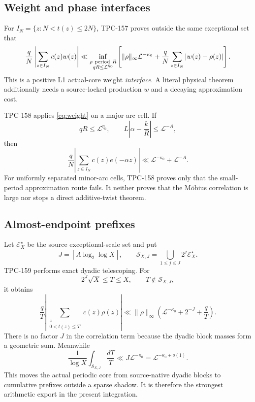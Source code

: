 \documentclass[11pt]{article}
\theoremstyle{definition}
\newcommand{\cL}{\mathcal L}
\newcommand{\cS}{\mathcal S}
\newcommand{\cE}{\mathcal E}
\begin{document}
\subsection{Weight and phase interfaces}

For \(I_N=\{z:N<t(z)\le 2N\}\), TPC-157 proves outside the same
exceptional set that
\begin{equation}
 \frac qN\left|\sum_{z\in I_N}c(z)w(z)\right|
 \ll
 \inf_{\substack{\rho\ {\rm period}\ R\\qR\le \cL^{\eta_0}}}
 \left[
   \|\rho\|_\infty\cL^{-\kappa_0}
   +\frac qN\sum_{z\in I_N}|w(z)-\rho(z)|
 \right].                                                     \label{eq:weight}
\end{equation}
This is a positive L1 actual-core weight \emph{interface}.  A literal
physical theorem additionally needs a source-locked production
\(w\) and a decaying approximation cost.

TPC-158 applies \eqref{eq:weight} on a major-arc cell.  If
\[
 qR\le\cL^{\eta_0},
 \qquad
 L\left|\alpha-\frac{k}{R}\right|\le\cL^{-A},
\]
then
\begin{equation}
 \frac qN\left|\sum_{z\in I_N}c(z)e(-\alpha z)\right|
 \ll \cL^{-\kappa_0}+\cL^{-A}.                                \label{eq:phase}
\end{equation}
For uniformly separated minor-arc cells, TPC-158 proves only that the
small-period approximation route fails.  It neither proves that the
M\"obius correlation is large nor stops a direct additive-twist
theorem.

\subsection{Almost-endpoint prefixes}

Let \(\cE_X^\star\) be the source exceptional-scale set and put
\[
 J=\left\lceil A\log_2\log X\right\rceil,
 \qquad
 \cS_{X,J}=\bigcup_{1\le j\le J}2^j\cE_X^\star.
\]
TPC-159 performs exact dyadic telescoping.  For
\[
 2^J\sqrt X\le T\le X,\qquad T\notin\cS_{X,J},
\]
it obtains
\begin{equation}
 \frac qT\left|
   \sum_{\substack{z\\0<t(z)\le T}}c(z)\rho(z)
 \right|
 \ll
 \|\rho\|_\infty
 \left(\cL^{-\kappa_0}+2^{-J}+\frac qT\right).                 \label{eq:prefix}
\end{equation}
There is no factor \(J\) in the correlation term because the dyadic
block masses form a geometric sum.  Meanwhile
\[
 \frac1{\log X}\int_{\cS_{X,J}}\frac{dT}{T}
 \ll J\cL^{-\kappa_0}
 =\cL^{-\kappa_0+o(1)}.
\]
This moves the actual periodic core from source-native dyadic blocks
to cumulative prefixes outside a sparse shadow.  It is therefore the
strongest arithmetic export in the present integration.
\end{document}
